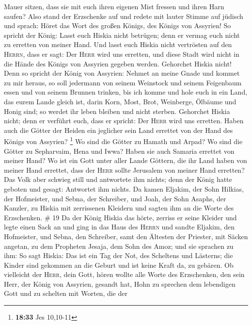 Mauer sitzen, dass sie mit euch ihren eigenen Mist fressen und ihren
Harn saufen?  Also stand der Erzschenke auf und redete
mit lauter Stimme auf jüdisch und sprach: Höret das Wort des großen
Königs, des Königs von Assyrien!  So spricht der König:
Lasst euch Hiskia nicht betrügen; denn er vermag euch nicht zu erretten
von meiner Hand.  Und lasst euch Hiskia nicht vertrösten
auf den \textsc{Herrn}, dass er sagt: Der \textsc{Herr} wird uns
erretten, und diese Stadt wird nicht in die Hände des Königs von
Assyrien gegeben werden.  Gehorchet Hiskia nicht! Denn so
spricht der König von Assyrien: Nehmet an meine Gnade und kommet zu mir
heraus, so soll jedermann von seinem Weinstock und seinem Feigenbaum
essen und von seinem Brunnen trinken,  bis ich komme und
hole euch in ein Land, das eurem Lande gleich ist, darin Korn, Most,
Brot, Weinberge, Ölbäume und Honig sind; so werdet ihr leben bleiben und
nicht sterben. Gehorchet Hiskia nicht; denn er verführt euch, dass er
spricht: Der \textsc{Herr} wird uns erretten.  Haben auch
die Götter der Heiden ein jeglicher sein Land errettet von der Hand des
Königs von Assyrien? \footnote{\textbf{18:33} Jes 10,10-11}
 Wo sind die Götter zu Hamath und Arpad? Wo sind die
Götter zu Sepharvaim, Hena und Iwwa? Haben sie auch Samaria errettet von
meiner Hand?  Wo ist ein Gott unter aller Lande Göttern,
die ihr Land haben von meiner Hand errettet, dass der \textsc{Herr}
sollte Jerusalem von meiner Hand erretten?  Das Volk aber
schwieg still und antwortete ihm nichts; denn der König hatte geboten
und gesagt: Antwortet ihm nichts.  Da kamen Eljakim, der
Sohn Hilkias, der Hofmeister, und Sebna, der Schreiber, und Joah, der
Sohn Asaphs, der Kanzler, zu Hiskia mit zerrissenen Kleidern und sagten
ihm an die Worte des Erzschenken. \# 19  Da der König
Hiskia das hörte, zerriss er seine Kleider und legte einen Sack an und
ging in das Haus des \textsc{Herrn}  und sandte Eljakim,
den Hofmeister, und Sebna, den Schreiber, samt den Ältesten der
Priester, mit Säcken angetan, zu dem Propheten Jesaja, dem Sohn des
Amoz;  und sie sprachen zu ihm: So sagt Hiskia: Das ist
ein Tag der Not, des Scheltens und Lästerns; die Kinder sind gekommen an
die Geburt und ist keine Kraft da, zu gebären.  Ob
vielleicht der \textsc{Herr}, dein Gott, hören wollte alle Worte des
Erzschenken, den sein Herr, der König von Assyrien, gesandt hat, Hohn zu
sprechen dem lebendigen Gott und zu schelten mit Worten, die der
